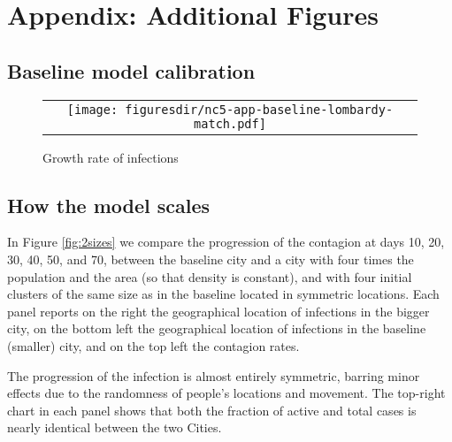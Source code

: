 \documentclass[english,11pt]{article}
\begin{document}
\section{Appendix: Additional Figures} \label{app:morefigures}

\subsection{Baseline model calibration}
\begin{figure}[H]
\caption{Growth rate of infections\label{fig-appgrowths}}
\begin{centering}
\begin{tabular}{c}
\texttt{[image: figuresdir/nc5-app-baseline-lombardy-match.pdf]}\tabularnewline
\end{tabular}
\par\end{centering}
\end{figure}

\subsection{How the model scales}
In Figure 
\ref{fig:2sizes}  we compare the  
progression of the contagion at days 10, 20, 30, 40, 50, and 70, between the baseline city 
and a city with four
times the population and the area (so that density is constant), and with four initial clusters of the same size as in the baseline
located in symmetric locations. Each panel reports on the right the geographical location of infections in the bigger city, on the bottom left the geographical location of infections in
the baseline (smaller) city, and on the top left the contagion rates. 

The progression of the infection is almost entirely
symmetric, barring minor effects due to the randomness of people's locations and movement. The top-right chart in each panel shows that both the fraction of active and total cases is nearly identical between the two Cities. 
\end{document}
